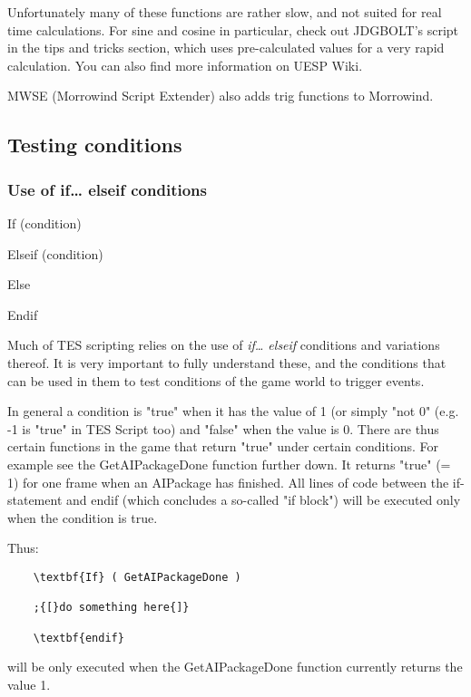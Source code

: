 Unfortunately many of these functions are rather slow, and not suited
for real time calculations. For sine and cosine in particular, check out
JDGBOLT's script in the tips and tricks section, which uses
pre-calculated values for a very rapid calculation. You can also find
more information on UESP Wiki.

MWSE (Morrowind Script Extender) also adds trig functions to Morrowind.

\protect\hypertarget{_Toc182634504}{}{}

\hypertarget{testing-conditions}{%
\subsection{Testing conditions}\label{testing-conditions}}

\hypertarget{use-of-if-elseif-conditions}{%
\subsubsection{Use of if\ldots{} elseif
conditions}\label{use-of-if-elseif-conditions}}

	If (condition)
	
	Elseif (condition)
	
	Else
	
	Endif

Much of TES scripting relies on the use of \emph{if\ldots{} elseif}
conditions and variations thereof. It is very important to fully
understand these, and the conditions that can be used in them to test
conditions of the game world to trigger events.

In general a condition is "true" when it has the value of 1 (or simply
"not 0" (e.g. -1 is "true" in TES Script too) and "false" when the value
is 0. There are thus certain functions in the game that return "true"
under certain conditions. For example see the GetAIPackageDone function
further down. It returns "true" (= 1) for one frame when an AIPackage
has finished. All lines of code between the if-statement and endif
(which concludes a so-called "if block") will be executed only when the
condition is true.

Thus:

\begin{lstlisting}
	\textbf{If} ( GetAIPackageDone )
	
	;{[}do something here{]}
	
	\textbf{endif}
\end{lstlisting}

will be only executed when the GetAIPackageDone function currently
returns the value 1.


